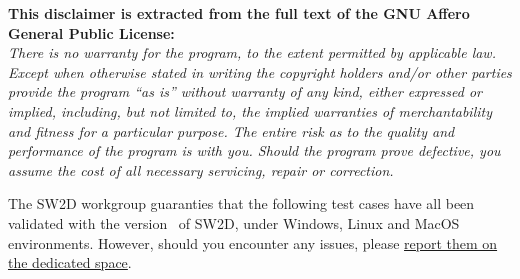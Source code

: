\begin{framed}
{\bf This disclaimer is extracted from the full text of the GNU Affero General Public License:}\\

\textit{There is no warranty for the program, to the extent permitted by
applicable law. 
Except when otherwise stated in writing the copyright holders and/or other parties provide the program “as is” without warranty of any kind, either expressed or implied, including, but not limited to, the implied warranties of merchantability and fitness for a particular purpose.  
The entire risk as to the quality and performance of the program is with you.  
Should the program prove defective, you assume the cost of all necessary servicing, repair or correction.}\\
\end{framed}


The SW2D workgroup guaranties that the following test cases have all been validated with the version \myversion~of SW2D, under Windows, Linux and MacOS environments. However, should you encounter any issues, please \href{https://gitlab.com/sw2d-workgroup/sw2d/-/issues}{report them on the dedicated space}.

\clearpage